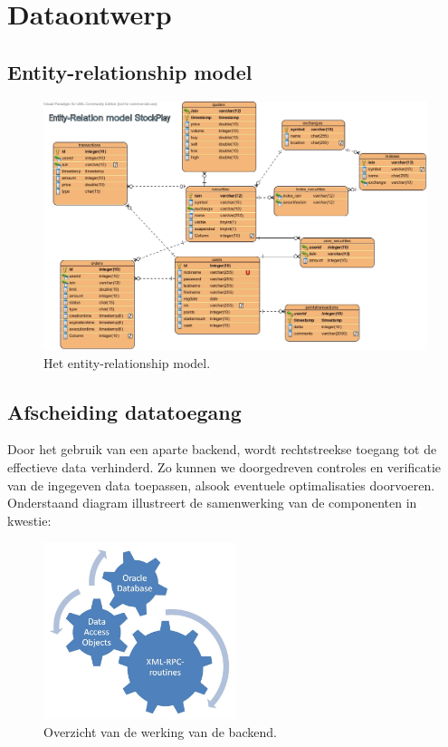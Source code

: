 %
%

\chapter{Dataontwerp}

\section{Entity-relationship model}
\begin{figure}[h!]
	\centering
		\includegraphics[width=\textwidth]{images/realisatie/ER_Diagram}
	\caption{Het entity-relationship model.}
\end{figure}

\section{Afscheiding datatoegang}

Door het gebruik van een aparte backend, wordt rechtstreekse toegang tot de effectieve data verhinderd. Zo kunnen we doorgedreven controles en verificatie van de ingegeven data toepassen, alsook eventuele optimalisaties doorvoeren. Onderstaand diagram illustreert de samenwerking van de componenten in kwestie:

\begin{figure}[h!]
	\centering
		\includegraphics[width=0.5\textwidth]{images/realisatie/Class_Diagram}
	\caption{Overzicht van de werking van de backend.}
\end{figure}

